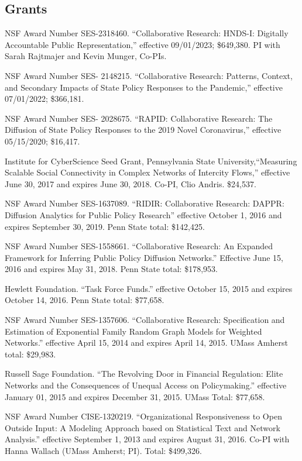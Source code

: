 \documentclass[overlapped,line]{res}
\begin{document}
\begin{resume}
\section{\bf Grants}
\begin{etaremune}
\item NSF Award Number SES-2318460. ``Collaborative Research: HNDS-I: Digitally Accountable Public Representation,'' effective 09/01/2023; \$649,380.  PI with Sarah Rajtmajer and Kevin Munger, Co-PIs.
\item NSF Award Number SES- 2148215. ``Collaborative Research: Patterns, Context, and Secondary Impacts of State Policy Responses to the Pandemic,'' effective 07/01/2022; \$366,181.
\item NSF Award Number SES- 2028675. ``RAPID: Collaborative Research: The Diffusion of State Policy Responses to the 2019 Novel Coronavirus,'' effective 05/15/2020; \$16,417.
\item Institute for CyberScience Seed Grant, Pennsylvania State University,``Measuring Scalable Social Connectivity in Complex Networks of Intercity Flows,'' effective June 30, 2017 and expires June 30, 2018. Co-PI, Clio Andris. \$24,537. 
 \item NSF Award Number SES-1637089. ``RIDIR: Collaborative Research: DAPPR: Diffusion Analytics for Public Policy Research'' effective October 1, 2016 and expires September 30, 2019.  Penn State total: \$142,425.
 \item NSF Award Number SES-1558661. ``Collaborative Research: An Expanded Framework for Inferring Public Policy Diffusion Networks.'' Effective June 15, 2016 and expires May 31, 2018. Penn State total: \$178,953.
  \item Hewlett Foundation. ``Task Force Funds.'' effective October 15, 2015 and expires October 14, 2016. Penn State total: \$77,658.
 \item NSF Award Number SES-1357606. ``Collaborative Research: Specification and Estimation of Exponential Family Random Graph Models for Weighted Networks.'' effective April 15, 2014 and expires April 14, 2015.  UMass Amherst total: \$29,983.
 \item Russell Sage Foundation. ``The Revolving Door in Financial Regulation: Elite Networks and the Consequences of Unequal Access on Policymaking.'' effective January 01, 2015 and expires December 31, 2015. UMass Total: \$77,658.
 \item NSF Award Number CISE-1320219. ``Organizational Responsiveness to Open Outside Input: A Modeling Approach based on Statistical Text and Network Analysis.'' effective September 1, 2013 and expires August 31, 2016.  Co-PI with Hanna Wallach (UMass Amherst; PI). Total: \$499,326.

\end{etaremune}
\end{resume}
\end{document}
